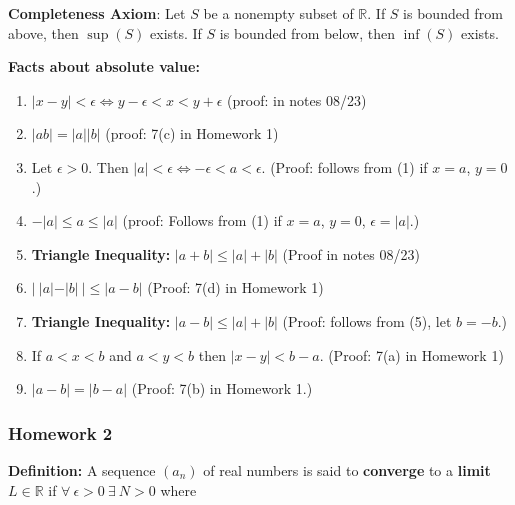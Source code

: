 \documentclass{article}
\begin{document}
\textbf{Completeness Axiom}: Let \(S\) be a nonempty subset of \(\mathbb{R}\). If \(S\) is bounded from above, then \(\sup(S)\) exists. If \(S\) is bounded from below, then \(\inf(S)\) exists.


\textbf{Facts about absolute value:}

\begin{enumerate}[(1)]

\item \(|x-y| < \epsilon \iff y - \epsilon < x < y + \epsilon\) (proof: in notes 08/23)

\item \(|ab| = |a||b|\) (proof: 7(c) in Homework 1)

\item Let \(\epsilon >0\). Then \(|a| < \epsilon \iff -\epsilon < a < \epsilon\). (Proof: follows from (1) if \(x = a\), \(y = 0\).)

\item \(-|a| \leq a \leq |a|\) (proof: Follows from (1) if \(x = a\), \(y = 0\), \(\epsilon = |a|\).)

\item \textbf{Triangle Inequality:} \(|a + b| \leq |a| + |b|\) (Proof in notes 08/23)

\item \(|\ |a| - |b| \ | \leq |a - b|\) (Proof: 7(d) in Homework 1)

\item \textbf{Triangle Inequality:} \(|a - b| \leq |a| + |b|\) (Proof: follows from (5), let \(b = -b\).)

\item If \(a < x < b\) and \(a < y < b\) then \(|x - y| < b - a\). (Proof: 7(a) in Homework 1)

\item \(|a - b| = |b - a|\) (Proof: 7(b) in Homework 1.)

\end{enumerate}

\subsubsection{Homework 2}

\textbf{Definition:} A sequence \((a_n)\) of real numbers is said to \textbf{converge} to a \textbf{limit} \(L \in \mathbb{R}\) if \(\forall \ \epsilon > 0 \ \exists \ N > 0 \) where
\end{document}
